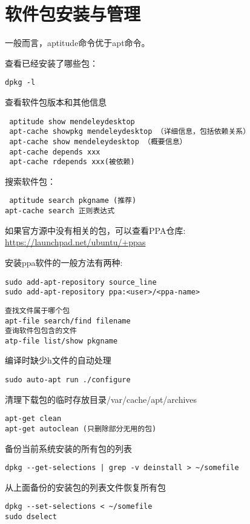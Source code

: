 \section{软件包安装与管理}

一般而言，aptitude命令优于apt命令。

查看已经安装了哪些包：
\begin{verbatim}
dpkg -l
\end{verbatim}

查看软件包版本和其他信息
\begin{verbatim}
 aptitude show mendeleydesktop
 apt-cache showpkg mendeleydesktop （详细信息，包括依赖关系）
 apt-cache show mendeleydesktop （概要信息）
 apt-cache depends xxx
 apt-cache rdepends xxx(被依赖)
\end{verbatim}

搜索软件包：
\begin{verbatim}
 aptitude search pkgname (推荐)
apt-cache search 正则表达式
\end{verbatim}

如果官方源中没有相关的包，可以查看PPA仓库:
\url{https://launchpad.net/ubuntu/+ppas}

安装ppa软件的一般方法有两种:
\begin{verbatim}
sudo add-apt-repository source_line
sudo add-apt-repository ppa:<user>/<ppa-name>
\end{verbatim}

\begin{verbatim}
查找文件属于哪个包
apt-file search/find filename
查询软件包包含的文件
atp-file list/show pkgname
\end{verbatim}

编译时缺少h文件的自动处理
\begin{verbatim}
sudo auto-apt run ./configure
\end{verbatim}

清理下载包的临时存放目录/var/cache/apt/archives
\begin{verbatim}
apt-get clean
apt-get autoclean (只删除部分无用的包)
\end{verbatim}

备份当前系统安装的所有包的列表
\begin{verbatim}
dpkg --get-selections | grep -v deinstall > ~/somefile
\end{verbatim}

从上面备份的安装包的列表文件恢复所有包
\begin{verbatim}
dpkg --set-selections < ~/somefile
sudo dselect
\end{verbatim}

